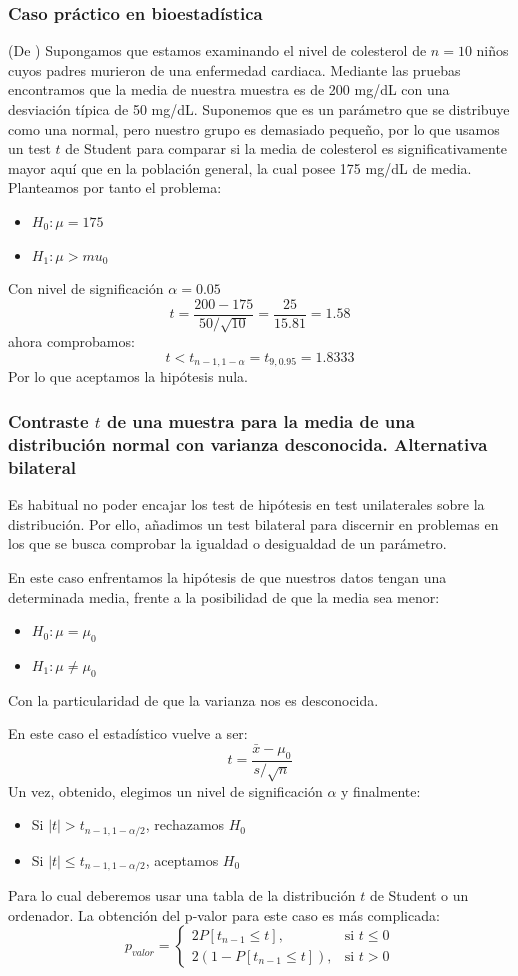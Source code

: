 \documentclass[a4paper,12pt]{article}
\begin{document}
 \subsubsection*{Caso práctico en bioestadística}
 (De \cite{rosner2015fundamentals}) 
Supongamos que estamos examinando el nivel de colesterol de $n=10$ niños cuyos padres murieron de una enfermedad cardiaca. Mediante las pruebas encontramos que la media de nuestra muestra es de 200 mg/dL con una desviación típica de 50 mg/dL. Suponemos que es un parámetro que se distribuye como una normal, pero nuestro grupo es demasiado pequeño, por lo que usamos un test $t$ de Student para comparar si la media de colesterol es significativamente mayor aquí que en la población general, la cual posee 175 mg/dL de media.
Planteamos por tanto el problema:
\begin{itemize}
	\item $H_0:\mu=175$
	\item $H_1: \mu>mu_0$
\end{itemize}
Con nivel de significación $\alpha=0.05$
$$t=\frac{200-175}{50/\sqrt{10}}=\frac{25}{15.81}=1.58$$
ahora comprobamos:
$$t<t_{n-1,1-\alpha}=t_{9,0.95}=1.8333$$
Por lo que aceptamos la hipótesis nula.

\subsubsection{Contraste $t$ de una muestra para la media de una distribución normal con varianza desconocida. Alternativa bilateral}
Es habitual no poder encajar los test de hipótesis en test unilaterales sobre la distribución. Por ello, añadimos un test bilateral para discernir en problemas en los que se busca comprobar la igualdad o desigualdad de un parámetro.

En este caso enfrentamos la hipótesis de que nuestros datos tengan una determinada media, frente a la posibilidad  de que la media sea menor: 
\begin{itemize}
	\item $H_0:\mu=\mu_0$
	\item $H_1: \mu\neq \mu_0$
\end{itemize}
Con la particularidad de que la varianza nos es desconocida.

En este caso el estadístico vuelve a ser: 
$$t=\frac{\bar{x}-\mu_0}{s/\sqrt{n}}$$
Un vez, obtenido, elegimos un nivel de significación $\alpha$ y finalmente:
\begin{itemize}
	\item Si $|t|>t_{n-1,1-\alpha/2}$, rechazamos $H_0$
	\item Si $|t|\leq t_{n-1,1-\alpha/2}$, aceptamos $H_0$
\end{itemize}
Para lo cual deberemos usar una tabla de la distribución $t$ de Student o un ordenador.
La obtención del p-valor para este caso es más complicada:
$$p_{valor} = \begin{cases} 2P[t_{n-1}\leq t], & \mbox{si } t\leq 0 \\ 2(1-P[t_{n-1}\leq t]), & \mbox{si } t>0 \end{cases}$$
\end{document}
